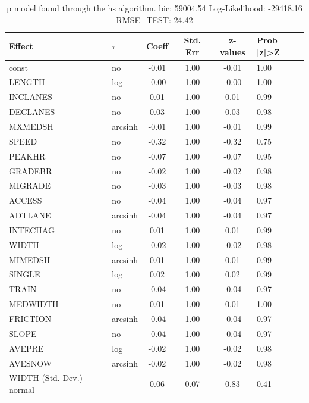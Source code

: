 \begin{table}
	\caption{p model found through the hs algorithm. bic: 59004.54 Log-Likelihood: -29418.16 RMSE_TEST: 24.42}
	\begin{center}
		\begin{tabular}{|l|l|c|c|c|l|}
			\hline
			Effect & $\tau$ & Coeff & Std. Err & z-values & Prob |z|>Z \\
			\hline
			const & no & -0.01 & 1.00 & -0.01 & 1.00 \\
			\hline
			LENGTH & log & -0.00 & 1.00 & -0.00 & 1.00 \\
			\hline
			INCLANES & no & 0.01 & 1.00 & 0.01 & 0.99 \\
			\hline
			DECLANES & no & 0.03 & 1.00 & 0.03 & 0.98 \\
			\hline
			MXMEDSH & arcsinh & -0.01 & 1.00 & -0.01 & 0.99 \\
			\hline
			SPEED & no & -0.32 & 1.00 & -0.32 & 0.75 \\
			\hline
			PEAKHR & no & -0.07 & 1.00 & -0.07 & 0.95 \\
			\hline
			GRADEBR & no & -0.02 & 1.00 & -0.02 & 0.98 \\
			\hline
			MIGRADE & no & -0.03 & 1.00 & -0.03 & 0.98 \\
			\hline
			ACCESS & no & -0.04 & 1.00 & -0.04 & 0.97 \\
			\hline
			ADTLANE & arcsinh & -0.04 & 1.00 & -0.04 & 0.97 \\
			\hline
			INTECHAG & no & 0.01 & 1.00 & 0.01 & 0.99 \\
			\hline
			WIDTH & log & -0.02 & 1.00 & -0.02 & 0.98 \\
			\hline
			MIMEDSH & arcsinh & 0.01 & 1.00 & 0.01 & 0.99 \\
			\hline
			SINGLE & log & 0.02 & 1.00 & 0.02 & 0.99 \\
			\hline
			TRAIN & no & -0.04 & 1.00 & -0.04 & 0.97 \\
			\hline
			MEDWIDTH & no & 0.01 & 1.00 & 0.01 & 1.00 \\
			\hline
			FRICTION & arcsinh & -0.04 & 1.00 & -0.04 & 0.97 \\
			\hline
			SLOPE & no & -0.04 & 1.00 & -0.04 & 0.97 \\
			\hline
			AVEPRE & log & -0.02 & 1.00 & -0.02 & 0.98 \\
			\hline
			AVESNOW & arcsinh & -0.02 & 1.00 & -0.02 & 0.98 \\
			\hline
			WIDTH (Std. Dev.) normal &  & 0.06 & 0.07 & 0.83 & 0.41 \\

\end{tabular}
\end{center}
\end{table}
